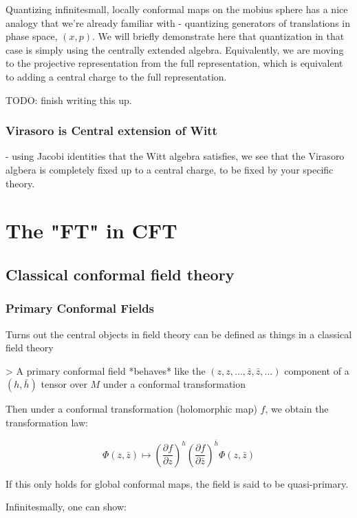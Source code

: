 Quantizing infinitesmall, locally conformal maps on the mobius sphere has a nice analogy that we're already familiar with - quantizing generators of translations in phase space, $(x, p)$. We will briefly  demonstrate here that quantization in that case is simply using the centrally extended algebra.  Equivalently, we are moving to the projective representation from the full representation, which is equivalent to adding a central charge to the full representation.

TODO: finish writing this up.

\subsubsection{ Virasoro is Central extension of Witt}
- using Jacobi identities that the Witt algebra satisfies, we see that the Virasoro algbera is completely fixed up to a central charge, to be fixed by your specific theory.

\section{The "FT" in CFT}

\subsection{ Classical conformal field theory}



\subsubsection{ Primary Conformal Fields}

Turns out the central objects in field theory can be defined as things in a classical field theory

> A primary conformal field *behaves* like the $(z, z, ... , \bar z, \bar z, ...)$ component of a $(h, \bar h)$ tensor over $M$ under a conformal transformation


Then under a conformal transformation (holomorphic map) $f$, we obtain the transformation law:

$$\Phi(z, \bar z) \mapsto \left( \frac{\partial f}{\partial z} \right) ^ h \left( \frac{\partial f}{\partial {\bar z}} \right) ^ {\bar h} \Phi(z, {\bar z}) $$

If this only holds for global conformal maps, the field is said to be quasi-primary. 

Infinitesmally, one can show:

